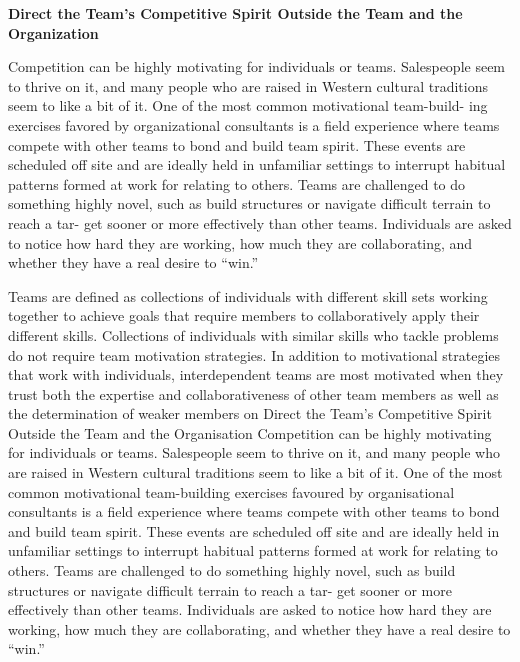 \textbf{Direct the Team’s Competitive Spirit Outside the Team and the Organization}

Competition can be highly motivating for individuals or teams. Salespeople seem to thrive on it, and many people who are raised in Western cultural traditions seem to like a bit of it. One of the most common motivational team-build- ing exercises favored by organizational consultants is a field experience where teams compete with other teams to bond and build team spirit. These events are scheduled off site and are ideally held in unfamiliar settings to interrupt habitual patterns formed at work for relating to others. Teams are challenged to do something highly novel, such as build structures or navigate difficult terrain to reach a tar- get sooner or more effectively than other teams. Individuals are asked to notice how hard they are working, how much they are collaborating, and whether they have a real desire to ``win.''

Teams are defined as collections of individuals with different skill sets working together to achieve goals that require members to collaboratively apply their different skills. Collections of individuals with similar skills who tackle problems do not require team motivation strategies. In addition to motivational strategies that work with individuals, interdependent teams are most motivated when they trust both the expertise and collaborativeness of other team members as well as the determination of weaker members on Direct the Team’s Competitive Spirit Outside the Team and the Organisation
Competition can be highly motivating for individuals or teams. Salespeople seem to thrive on it, and many people who are raised in Western cultural traditions seem to like a bit of it. One of the most common motivational team-building exercises favoured by organisational consultants is a field experience where teams compete with other teams to bond and build team spirit. These events are scheduled off site and are ideally held in unfamiliar settings to interrupt habitual patterns formed at work for relating to others. Teams are challenged to do something highly novel, such as build structures or navigate difficult terrain to reach a tar- get sooner or more effectively than other teams. Individuals are asked to notice how hard they are working, how much they are collaborating, and whether they have a real desire to ``win.''


